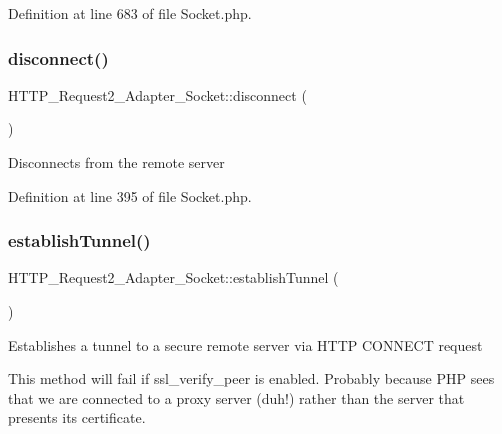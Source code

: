 Definition at line 683 of file Socket.\+php.

\hypertarget{classHTTP__Request2__Adapter__Socket_a20cf7acb1fb9f0f80929ec368fc4ff8f}{}\label{classHTTP__Request2__Adapter__Socket_a20cf7acb1fb9f0f80929ec368fc4ff8f} 
\subsubsection{\texorpdfstring{disconnect()}{disconnect()}}
{\footnotesize\ttfamily H\+T\+T\+P\+\_\+\+Request2\+\_\+\+Adapter\+\_\+\+Socket\+::disconnect (\begin{DoxyParamCaption}{ }\end{DoxyParamCaption})\hspace{0.3cm}{\ttfamily [protected]}}

Disconnects from the remote server 

Definition at line 395 of file Socket.\+php.

\hypertarget{classHTTP__Request2__Adapter__Socket_a924bbeb198c174580c109eb563079296}{}\label{classHTTP__Request2__Adapter__Socket_a924bbeb198c174580c109eb563079296} 
\subsubsection{\texorpdfstring{establish\+Tunnel()}{establishTunnel()}}
{\footnotesize\ttfamily H\+T\+T\+P\+\_\+\+Request2\+\_\+\+Adapter\+\_\+\+Socket\+::establish\+Tunnel (\begin{DoxyParamCaption}{ }\end{DoxyParamCaption})\hspace{0.3cm}{\ttfamily [protected]}}

Establishes a tunnel to a secure remote server via H\+T\+TP C\+O\+N\+N\+E\+CT request

This method will fail if \textquotesingle{}ssl\+\_\+verify\+\_\+peer\textquotesingle{} is enabled. Probably because P\+HP sees that we are connected to a proxy server (duh!) rather than the server that presents its certificate.

